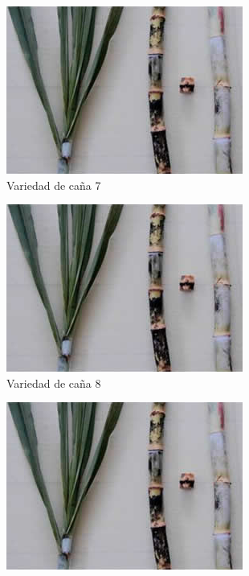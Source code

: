 \documentclass{article}%
\begin{document}
\begin{figure}[h!]%
\begin{subfigure}{0.33\linewidth}%
\includegraphics[width=0.95\linewidth]{Cana/RD75-11.png}%
\caption{Variedad de caña 7}%
\end{subfigure}%
\begin{subfigure}{0.33\linewidth}%
\includegraphics[width=0.95\linewidth]{Cana/RD75-11.png}%
\caption{Variedad de caña 8}%
\end{subfigure}%
\begin{subfigure}{0.33\linewidth}%
\includegraphics[width=0.95\linewidth]{Cana/RD75-11.png}%

\end{subfigure}
\end{figure}
\end{document}
